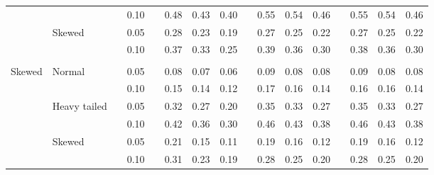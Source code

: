 \documentclass{article} %
\begin{document}
\begin{table}[ht]
\begin{scriptsize}
\begin{center}
\begin{tabular}{ll p{.1cm} c p{.1cm} rrr p{.1cm} rrr p{.1cm} rrr}
             &              && 0.10 &&   0.48 & 0.43 & 0.40 && 0.55 & 0.54 & 0.46 && 0.55 & 0.54 & 0.46 \\ 
             & Skewed       && 0.05 &&   0.28 & 0.23 & 0.19 && 0.27 & 0.25 & 0.22 && 0.27 & 0.25 & 0.22 \\ 
             &              && 0.10 &&   0.37 & 0.33 & 0.25 && 0.39 & 0.36 & 0.30 && 0.38 & 0.36 & 0.30 \\ 
             &&&&&&&&&&&&&&&\\
Skewed       & Normal       && 0.05 &&   0.08 & 0.07 & 0.06 && 0.09 & 0.08 & 0.08 && 0.09 & 0.08 & 0.08 \\ 
             &              && 0.10 &&   0.15 & 0.14 & 0.12 && 0.17 & 0.16 & 0.14 && 0.16 & 0.16 & 0.14 \\ 
             & Heavy tailed && 0.05 &&   0.32 & 0.27 & 0.20 && 0.35 & 0.33 & 0.27 && 0.35 & 0.33 & 0.27 \\ 
             &              && 0.10 &&   0.42 & 0.36 & 0.30 && 0.46 & 0.43 & 0.38 && 0.46 & 0.43 & 0.38 \\ 
             & Skewed       && 0.05 &&   0.21 & 0.15 & 0.11 && 0.19 & 0.16 & 0.12 && 0.19 & 0.16 & 0.12 \\ 
             &              && 0.10 &&   0.31 & 0.23 & 0.19 && 0.28 & 0.25 & 0.20 && 0.28 & 0.25 & 0.20 \\ 



\end{tabular}
\end{center}
\end{scriptsize}
\end{table}
\end{document}
